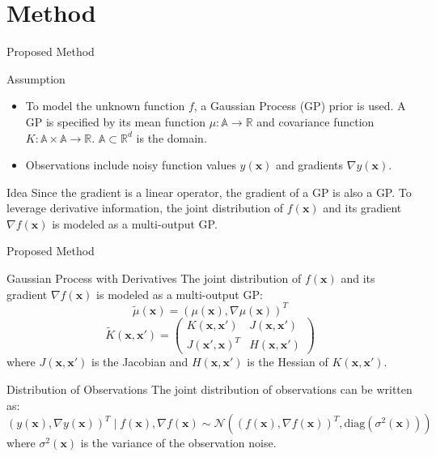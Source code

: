 \documentclass{beamer}
\begin{document}
\section{Method}
\begin{frame}{Proposed Method}
    \begin{block}{Assumption}
        \begin{itemize}
            \item To model the unknown function $f$, a Gaussian Process (GP) prior is used. A GP is specified by its mean function $\mu: \mathbb{A} \to \mathbb{R}$ and covariance function $K: \mathbb{A} \times \mathbb{A} \to \mathbb{R}$. $\mathbb{A} \subset \mathbb{R}^d$ is the domain.
            \item Observations include noisy function values $y(\mathbf{x})$ and gradients $\nabla y(\mathbf{x})$.
        \end{itemize}
    \end{block}
    \begin{alertblock}{Idea}
        Since the gradient is a linear operator, the gradient of a GP is also a GP. To leverage derivative information, the joint distribution of $f(\mathbf{x})$ and its gradient $\nabla f(\mathbf{x})$ is modeled as a multi-output GP.
    \end{alertblock}
\end{frame}

\begin{frame}{Proposed Method}
\begin{block}{Gaussian Process with Derivatives}
        The joint distribution of $f(\mathbf{x})$ and its gradient $\nabla f(\mathbf{x})$ is modeled as a multi-output GP:
        \[
        \tilde{\mu}(\mathbf{x}) = (\mu(\mathbf{x}), \nabla \mu(\mathbf{x}))^T
        \]
        \[
        \tilde{K}(\mathbf{x}, \mathbf{x}') = \begin{pmatrix}
        K(\mathbf{x}, \mathbf{x}') & J(\mathbf{x}, \mathbf{x}') \\
        J(\mathbf{x}', \mathbf{x})^T & H(\mathbf{x}, \mathbf{x}')
        \end{pmatrix}
        \]
        where $J(\mathbf{x}, \mathbf{x}')$ is the Jacobian and $H(\mathbf{x}, \mathbf{x}')$ is the Hessian of $K(\mathbf{x}, \mathbf{x}')$.
\end{block}
\begin{block}{Distribution of Observations}
The joint distribution of observations can be written as:
\[
(y(\mathbf{x}), \nabla y(\mathbf{x}))^T \mid f(\mathbf{x}), \nabla f(\mathbf{x}) \sim \mathcal{N} \left( (f(\mathbf{x}), \nabla f(\mathbf{\mathbf{x}}))^T, \text{diag}(\sigma^2(\mathbf{x})) \right)
\]
where \( \sigma^2(\mathbf{x}) \) is the variance of the observation noise.
\end{block}
\end{frame}
\end{document}
